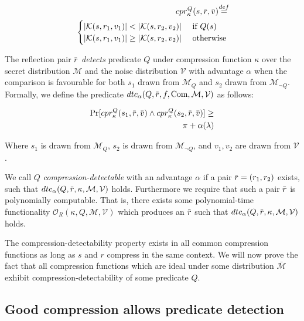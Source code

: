 \documentclass[conference, letterpaper, 10pt]{IEEEtran}
\newcommand\defeq{\stackrel{\mathclap{\normalfont\mbox{def}}}{=}}
\newcommand{\overbar}[1]{\mkern 1.5mu\overline{\mkern-1.5mu#1\mkern-1.5mu}\mkern 1.5mu}
\begin{document}
\begin{equation*}
\begin{split}
    cpr^Q_{\kappa}(s, \overbar{r}, \overbar{v})
    \defeq\\
    \begin{cases}
        |\mathcal{K}(s, r_1, v_1)| < |\mathcal{K}(s, r_2, v_2)| &\text{ if } Q(s)\\
        |\mathcal{K}(s, r_1, v_1)| \geq |\mathcal{K}(s, r_2, v_2)| &\text{ otherwise}
    \end{cases}
\end{split}
\end{equation*}

The reflection pair $\overbar{r}$ \textit{detects} predicate $Q$ under
compression function $\kappa$ over the secret distribution $\mathcal{M}$ and
the noise distribution $\mathcal{V}$ with advantage $\alpha$ when the
comparison is favourable for both $s_1$ drawn from $\mathcal{M}_Q$ and $s_2$
drawn from $\mathcal{M}_{\lnot Q}$. Formally, we define the predicate
$dtc_\alpha(Q, \overbar{r}, f, \textrm{Com}, \mathcal{M}, \mathcal{V})$ as follows:

\begin{align*}
    \Pr
        [cpr^Q_{\kappa}(s_1, \overbar{r}, \overbar{v}) \land
         cpr^Q_{\kappa}(s_2, \overbar{r}, \overbar{v})]
    \geq\\
    \pi + \alpha(\lambda)
\end{align*}

Where $s_1$ is drawn from $\mathcal{M}_Q$, $s_2$ is drawn from
$\mathcal{M}_{\lnot Q}$, and $v_1, v_2$ are drawn from $\mathcal{V}$.

We call $Q$ \textit{compression-detectable} with an advantage $\alpha$ if a
pair $\overbar{r} = (r_1, r_2)$ exists, such that $dtc_\alpha(Q, \overbar{r},
\kappa, \mathcal{M}, \mathcal{V})$ holds. Furthermore we require that such a
pair $\overbar{r}$ is polynomially computable. That is, there exists some
polynomial-time functionality $\mathcal{O}_R(\kappa, Q, \mathcal{M},
\mathcal{V})$ which produces an $\overbar{r}$ such that $dtc_\alpha(Q,
\overbar{r}, \kappa, \mathcal{M}, \mathcal{V})$ holds.

The compression-detectability property exists in all common compression
functions as long as $s$ and $r$ compress in the same context. We will now
prove the fact that all compression functions which are ideal under some
distribution $\bar{\mathcal{M}}$ exhibit compression-detectability of some
predicate $Q$.

\subsection{Good compression allows predicate detection}
\end{document}
